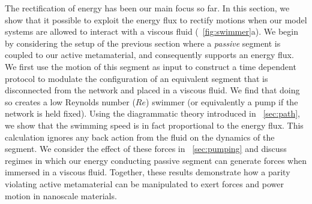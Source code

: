 \documentclass[
 preprint,
 preprintnumbers,
 amsmath,amssymb,
 aps,
 pre,
 longbibliography,
 superscriptaddress,
 10pt, twocolumn
]{revtex4-1}
\begin{document}
The rectification of energy has been our main focus so far. In this section, we show that it possible to exploit the energy flux to rectify motions when our model systems are allowed to interact with a viscous fluid (\figurename~\ref{fig:swimmer}a).
We begin by considering the setup of the previous section where a {\it passive} segment is coupled to our active metamaterial, and consequently supports an energy flux.
We first use the motion of this segment as input to construct a time dependent protocol to modulate the configuration of an equivalent segment that is disconnected from the network and placed in a viscous fluid. We find that doing so creates a low Reynolds number ($Re$) swimmer (or equivalently a pump if the network is held fixed). Using the diagrammatic theory introduced in \secname~\ref{sec:path}, we show that the swimming speed is in fact proportional to the energy flux. This calculation ignores any back action from the fluid on the dynamics of the segment. We consider the effect of these forces in \secname~\ref{sec:pumping} and discuss regimes in which our energy conducting passive segment can generate forces when immersed in a viscous fluid. Together, these results demonstrate how a parity violating active metamaterial can be manipulated to exert forces and power motion in nanoscale materials.  
\end{document}
